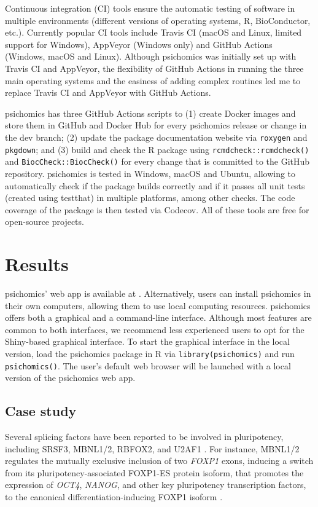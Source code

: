 Continuous integration (CI) tools ensure the automatic testing of software in multiple environments (different versions of operating systems, R, BioConductor, etc.). Currently popular CI tools include Travis CI (macOS and Linux, limited support for Windows), AppVeyor (Windows only) and GitHub Actions (Windows, macOS and Linux). Although psichomics was initially set up with Travis CI and AppVeyor, the flexibility of GitHub Actions in running the three main operating systems and the easiness of adding complex routines led me to replace Travis CI and AppVeyor with GitHub Actions.

psichomics has three GitHub Actions scripts to (1) create Docker images and store them in GitHub and Docker Hub for every psichomics release or change in the dev branch; (2) update the package documentation website via \texttt{roxygen} and \texttt{pkgdown}; and (3) build and check the R package using \texttt{rcmdcheck::rcmdcheck()} and \texttt{BiocCheck::BiocCheck()} for every change that is committed to the GitHub repository. psichomics is tested in Windows, macOS and Ubuntu, allowing to automatically check if the package builds correctly and if it passes all unit tests (created using testthat) in multiple platforms, among other checks. The code coverage of the package is then tested via Codecov. All of these tools are free for open-source projects.

\section{Results}

psichomics' web app is available at . Alternatively, users can install psichomics in their own computers, allowing them to use local computing resources. psichomics offers both a graphical and a command-line interface. Although most features are common to both interfaces, we recommend less experienced users to opt for the Shiny-based graphical interface. To start the graphical interface in the local version, load the psichomics package in R via \texttt{library(psichomics)} and run \texttt{psichomics()}. The user's default web browser will be launched with a local version of the psichomics web app.

\subsection{Case study}

Several splicing factors have been reported to be involved in pluripotency, including SRSF3, MBNL1/2, RBFOX2, and U2AF1 \cite{zavolan:2018vi,han:2013ww,venables:2013tz,chen:2015wm}. For instance, MBNL1/2 regulates the mutually exclusive inclusion of two \emph{FOXP1} exons, inducing a switch from its pluripotency-associated FOXP1-ES protein isoform, that promotes the expression of \emph{OCT4}, \emph{NANOG}, and other key pluripotency transcription factors, to the canonical differentiation-inducing FOXP1 isoform \cite{gabut:2011wk}.

